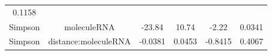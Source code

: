 \documentclass[]{article}
\begin{document}
\begin{longtable}[]{@{}cccccc@{}}
\begin{minipage}[t]{0.09\columnwidth}
0.1158\strut
\end{minipage}\tabularnewline
\begin{minipage}[t]{0.12\columnwidth}\centering\strut
Simpson\strut
\end{minipage} & \begin{minipage}[t]{0.24\columnwidth}\centering\strut
moleculeRNA\strut
\end{minipage} & \begin{minipage}[t]{0.11\columnwidth}\centering\strut
-23.84\strut
\end{minipage} & \begin{minipage}[t]{0.14\columnwidth}\centering\strut
10.74\strut
\end{minipage} & \begin{minipage}[t]{0.12\columnwidth}\centering\strut
-2.22\strut
\end{minipage} & \begin{minipage}[t]{0.09\columnwidth}\centering\strut
0.0341\strut
\end{minipage}\tabularnewline
\begin{minipage}[t]{0.12\columnwidth}\centering\strut
Simpson\strut
\end{minipage} & \begin{minipage}[t]{0.24\columnwidth}\centering\strut
distance:moleculeRNA\strut
\end{minipage} & \begin{minipage}[t]{0.11\columnwidth}\centering\strut
-0.0381\strut
\end{minipage} & \begin{minipage}[t]{0.14\columnwidth}\centering\strut
0.0453\strut
\end{minipage} & \begin{minipage}[t]{0.12\columnwidth}\centering\strut
-0.8415\strut
\end{minipage} & \begin{minipage}[t]{0.09\columnwidth}\centering\strut
0.4067\strut
\end{minipage}\tabularnewline
\bottomrule
\end{longtable}
\end{document}
